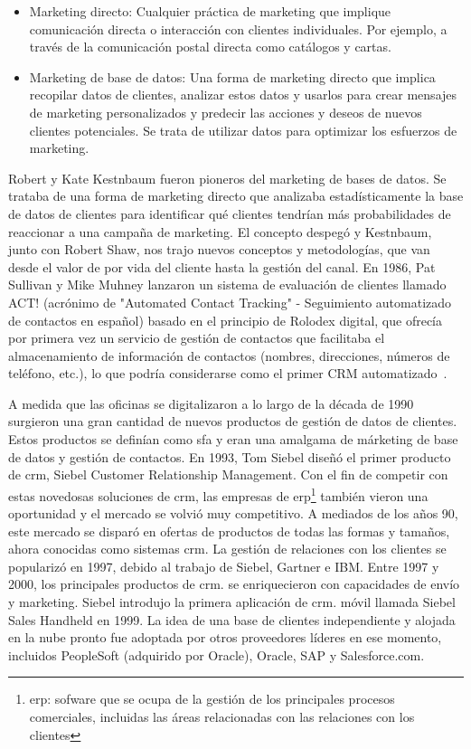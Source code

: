\begin{itemize}
\item Marketing directo: Cualquier práctica de marketing que implique comunicación directa o interacción con clientes individuales. Por ejemplo, a través de la comunicación postal directa como catálogos y cartas.
\item Marketing de base de datos: Una forma de marketing directo que implica recopilar datos de clientes, analizar estos datos y usarlos para crear mensajes de marketing personalizados y predecir las acciones y deseos de nuevos clientes potenciales. Se trata de utilizar datos para optimizar los esfuerzos de marketing.
\end{itemize}


Robert y Kate Kestnbaum fueron pioneros del marketing de bases de datos. Se trataba de una forma de marketing directo que analizaba estadísticamente la base de datos de clientes para identificar qué clientes tendrían más probabilidades de reaccionar a una campaña de marketing. El concepto despegó y Kestnbaum, junto con Robert Shaw, nos trajo nuevos conceptos y metodologías, que van desde el valor de por vida del cliente hasta la gestión del canal. En 1986, Pat Sullivan y Mike Muhney lanzaron un sistema de evaluación de clientes llamado ACT! (acrónimo de "Automated Contact Tracking" - Seguimiento automatizado de contactos en español) basado en el principio de Rolodex digital, que ofrecía por primera vez un servicio de gestión de contactos que facilitaba el almacenamiento de información de contactos (nombres, direcciones, números de teléfono, etc.), lo que podría considerarse como el primer CRM automatizado~\cite{SalesforceCRM}. 


A medida que las oficinas se digitalizaron a lo largo de la década de 1990 surgieron una gran cantidad de nuevos productos de gestión de datos de clientes. Estos productos se definían como \acrfull{sfa} y eran una amalgama de márketing de base de datos y gestión de contactos. En 1993, Tom Siebel diseñó el primer producto de \acrshort{crm}, Siebel Customer Relationship Management. Con el fin de competir con estas novedosas soluciones de \acrshort{crm}, las empresas de \acrfull{erp}\footnote{\acrshort{erp}: sofware que se ocupa de la gestión de los principales procesos comerciales, incluidas las áreas relacionadas con las relaciones con los clientes} también vieron una oportunidad y el mercado se volvió muy competitivo. A mediados de los años 90, este mercado se disparó en ofertas de productos de todas las formas y tamaños, ahora conocidas como sistemas \acrshort{crm}. La gestión de relaciones con los clientes se popularizó en 1997, debido al trabajo de Siebel, Gartner e IBM. Entre 1997 y 2000, los principales productos de \acrshort{crm}. se enriquecieron con capacidades de envío y marketing. Siebel introdujo la primera aplicación de \acrshort{crm}. móvil llamada Siebel Sales Handheld en 1999. La idea de una base de clientes independiente y alojada en la nube pronto fue adoptada por otros proveedores líderes en ese momento, incluidos PeopleSoft (adquirido por Oracle), Oracle, SAP y Salesforce.com.

